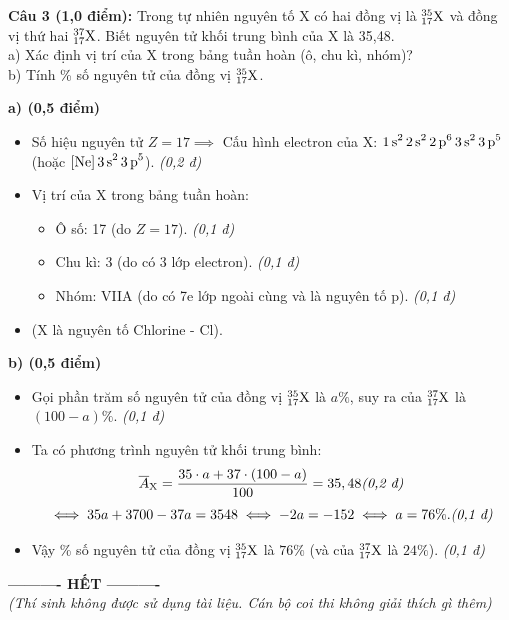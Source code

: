 \documentclass[11pt,a4paper]{article}
\begin{document}
\vspace{4pt}
\noindent
\textbf{Câu 3 (1,0 điểm):} Trong tự nhiên nguyên tố X có hai đồng vị là $^{35}_{17}\ce{X}$ và đồng vị thứ hai $^{37}_{17}\ce{X}$. Biết nguyên tử khối trung bình của X là 35,48.\\
a) Xác định vị trí của X trong bảng tuần hoàn (ô, chu kì, nhóm)?\\
b) Tính \% số nguyên tử của đồng vị $^{35}_{17}\ce{X}$.

\begin{tcolorbox}[colback=white,colframe=solBlue,title=\textbf{Lời giải chi tiết và Biểu điểm Câu 3:}]
\textbf{a) (0,5 điểm)}
\begin{itemize}[leftmargin=1.0cm]
\item Số hiệu nguyên tử $Z = 17 \implies$ Cấu hình electron của X: $\ce{1s^2 2s^2 2p^6 3s^2 3p^5}$ (hoặc $\ce{[Ne] 3s^2 3p^5}$). \hfill \textit{(0,2 đ)}
\item Vị trí của X trong bảng tuần hoàn:
  \begin{itemize}
  \item Ô số: 17 (do $Z = 17$). \hfill \textit{(0,1 đ)}
  \item Chu kì: 3 (do có 3 lớp electron). \hfill \textit{(0,1 đ)}
  \item Nhóm: VIIA (do có 7e lớp ngoài cùng và là nguyên tố p). \hfill \textit{(0,1 đ)}
  \end{itemize}
\item (X là nguyên tố Chlorine - Cl).
\end{itemize}
\textbf{b) (0,5 điểm)}
\begin{itemize}[leftmargin=1.0cm]
\item Gọi phần trăm số nguyên tử của đồng vị $^{35}_{17}\ce{X}$ là $a\%$, suy ra của $^{37}_{17}\ce{X}$ là $(100 - a)\%$. \hfill \textit{(0,1 đ)}
\item Ta có phương trình nguyên tử khối trung bình:
$$\overline{A}_{\ce{X}} = \dfrac{35 \cdot a + 37 \cdot (100 - a)}{100} = 35,48 \hfill \textit{(0,2 đ)}$$
$$\iff 35a + 3700 - 37a = 3548 \iff -2a = -152 \iff a = 76\%. \hfill \textit{(0,1 đ)}$$
\item Vậy \% số nguyên tử của đồng vị $^{35}_{17}\ce{X}$ là $76\%$ (và của $^{37}_{17}\ce{X}$ là $24\%$). \hfill \textit{(0,1 đ)}
\end{itemize}
\end{tcolorbox}

\vspace{6pt}
\begin{center}
\textbf{---------- HẾT ----------}\\
\textit{\small (Thí sinh không được sử dụng tài liệu. Cán bộ coi thi không giải thích gì thêm)}
\end{center}
\end{document}
